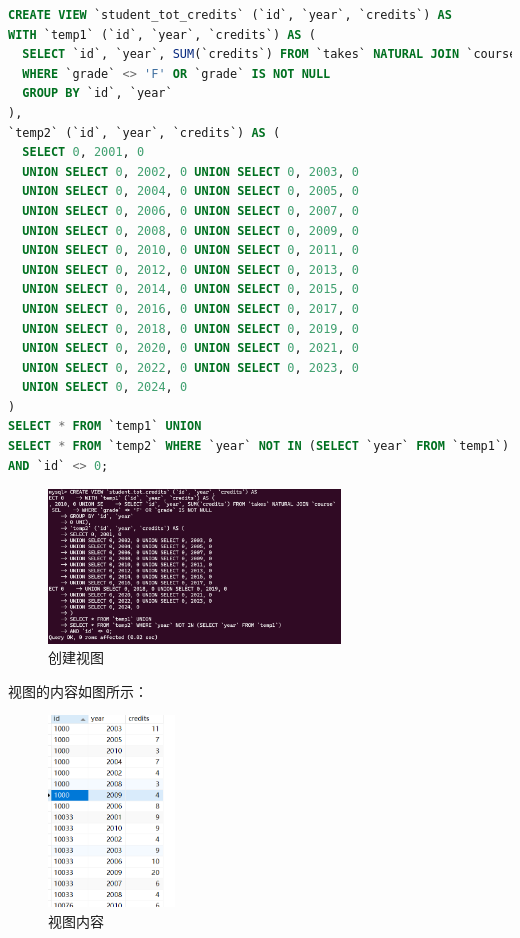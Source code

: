 \documentclass{article}
\begin{document}
\begin{enumerate}
\begin{lstlisting}[language=sql]
CREATE VIEW `student_tot_credits` (`id`, `year`, `credits`) AS
WITH `temp1` (`id`, `year`, `credits`) AS (
  SELECT `id`, `year`, SUM(`credits`) FROM `takes` NATURAL JOIN `course`
  WHERE `grade` <> 'F' OR `grade` IS NOT NULL
  GROUP BY `id`, `year`
),
`temp2` (`id`, `year`, `credits`) AS (
  SELECT 0, 2001, 0 
  UNION SELECT 0, 2002, 0 UNION SELECT 0, 2003, 0 
  UNION SELECT 0, 2004, 0 UNION SELECT 0, 2005, 0 
  UNION SELECT 0, 2006, 0 UNION SELECT 0, 2007, 0 
  UNION SELECT 0, 2008, 0 UNION SELECT 0, 2009, 0 
  UNION SELECT 0, 2010, 0 UNION SELECT 0, 2011, 0 
  UNION SELECT 0, 2012, 0 UNION SELECT 0, 2013, 0 
  UNION SELECT 0, 2014, 0 UNION SELECT 0, 2015, 0 
  UNION SELECT 0, 2016, 0 UNION SELECT 0, 2017, 0 
  UNION SELECT 0, 2018, 0 UNION SELECT 0, 2019, 0 
  UNION SELECT 0, 2020, 0 UNION SELECT 0, 2021, 0 
  UNION SELECT 0, 2022, 0 UNION SELECT 0, 2023, 0
  UNION SELECT 0, 2024, 0
)
SELECT * FROM `temp1` UNION
SELECT * FROM `temp2` WHERE `year` NOT IN (SELECT `year` FROM `temp1`)
AND `id` <> 0;
\end{lstlisting}

\begin{figure}[H]
  \centering
  \includegraphics[width=0.69\textwidth]{img/41.png}
  \caption{创建视图}
\end{figure}

视图的内容如图所示：

\begin{figure}[H]
  \centering
  \includegraphics[width=0.3\textwidth]{img/42.png}
  \caption{视图内容}
\end{figure}


\end{enumerate}
\end{document}
